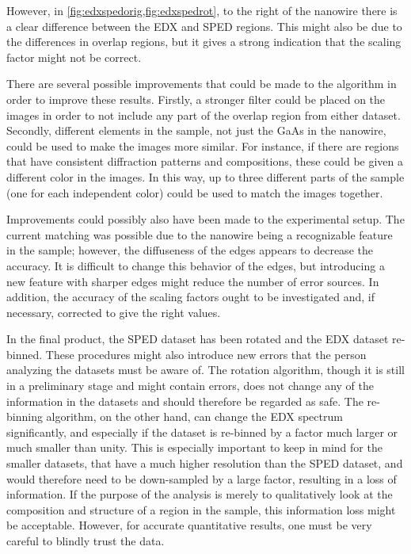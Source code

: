 However, in \cref{fig:edxspedorig,fig:edxspedrot}, to the right of the nanowire there is a clear difference between the EDX and SPED regions. This might also be due to the differences in overlap regions, but it gives a strong indication that the scaling factor might not be correct.

There are several possible improvements that could be made to the algorithm in order to improve these results. Firstly, a stronger filter could be placed on the images in order to not include any part of the overlap region from either dataset. Secondly, different elements in the sample, not just the GaAs in the nanowire, could be used to make the images more similar. For instance, if there are regions that have consistent diffraction patterns and compositions, these could be given a different color in the images. In this way, up to three different parts of the sample (one for each independent color) could be used to match the images together.

Improvements could possibly also have been made to the experimental setup. The current matching was possible due to the nanowire being a recognizable feature in the sample; however, the diffuseness of the edges appears to decrease the accuracy. It is difficult to change this behavior of the edges, but introducing a new feature with sharper edges might reduce the number of error sources. In addition, the accuracy of the scaling factors ought to be investigated and, if necessary, corrected to give the right values.

In the final product, the SPED dataset has been rotated and the EDX dataset re-binned. These procedures might also introduce new errors that the person analyzing the datasets must be aware of. The rotation algorithm, though it is still in a preliminary stage and might contain errors, does not change any of the information in the datasets and should therefore be regarded as safe. The re-binning algorithm, on the other hand, can change the EDX spectrum significantly, and especially if the dataset is re-binned by a factor much larger or much smaller than unity. This is especially important to keep in mind for the smaller datasets, that have a much higher resolution than the SPED dataset, and would therefore need to be down-sampled by a large factor,  resulting in a loss of information. If the purpose of the analysis is merely to qualitatively look at the composition and structure of a region in the sample, this information loss might be acceptable. However, for accurate quantitative results, one must be very careful to blindly trust the data.

